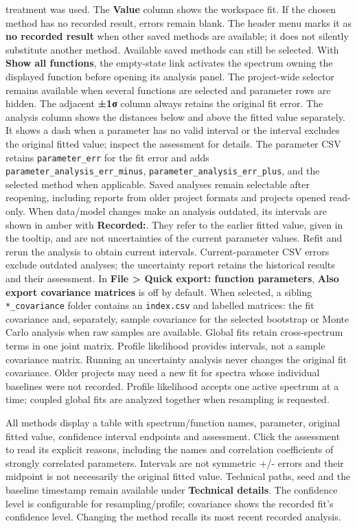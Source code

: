 \documentclass[
  10pt,
  a4paper,
  oneside]{scrreprt}
\begin{document}
treatment was used. The \textbf{Value} column shows the workspace fit.
If the chosen method has no recorded result, errors remain blank. The
header menu marks it as \textbf{no recorded result} when other saved
methods are available; it does not silently substitute another method.
Available saved methods can still be selected. With \textbf{Show all
functions}, the empty-state link activates the spectrum owning the
displayed function before opening its analysis panel. The project-wide
selector remains available when several functions are selected and
parameter rows are hidden. The adjacent \textbf{±1σ} column always
retains the original fit error. The analysis column shows the distances
below and above the fitted value separately. It shows a dash when a
parameter has no valid interval or the interval excludes the original
fitted value; inspect the assessment for details. The parameter CSV
retains \texttt{parameter\_err} for the fit error and adds
\texttt{parameter\_analysis\_err\_minus},
\texttt{parameter\_analysis\_err\_plus}, and the selected method when
applicable. Saved analyses remain selectable after reopening, including
reports from older project formats and projects opened read-only. When
data/model changes make an analysis outdated, its intervals are shown in
amber with \textbf{Recorded:}. They refer to the earlier fitted value,
given in the tooltip, and are not uncertainties of the current parameter
values. Refit and rerun the analysis to obtain current intervals.
Current-parameter CSV errors exclude outdated analyses; the uncertainty
report retains the historical results and their assessment. In
\textbf{File \textgreater{} Quick export: function parameters},
\textbf{Also export covariance matrices} is off by default. When
selected, a sibling \texttt{*\_covariance} folder contains an
\texttt{index.csv} and labelled matrices: the fit covariance and,
separately, sample covariance for the selected bootstrap or Monte Carlo
analysis when raw samples are available. Global fits retain
cross-spectrum terms in one joint matrix. Profile likelihood provides
intervals, not a sample covariance matrix. Running an uncertainty
analysis never changes the original fit covariance. Older projects may
need a new fit for spectra whose individual baselines were not recorded.
Profile likelihood accepts one active spectrum at a time; coupled global
fits are analyzed together when resampling is requested.

All methods display a table with spectrum/function names, parameter,
original fitted value, confidence interval endpoints and assessment.
Click the assessment to read its explicit reasons, including the names
and correlation coefficients of strongly correlated parameters.
Intervals are not symmetric +/- errors and their midpoint is not
necessarily the original fitted value. Technical paths, seed and the
baseline timestamp remain available under \textbf{Technical details}.
The confidence level is configurable for resampling/profile; covariance
shows the recorded fit's confidence level. Changing the method recalls
its most recent recorded analysis.
\end{document}
